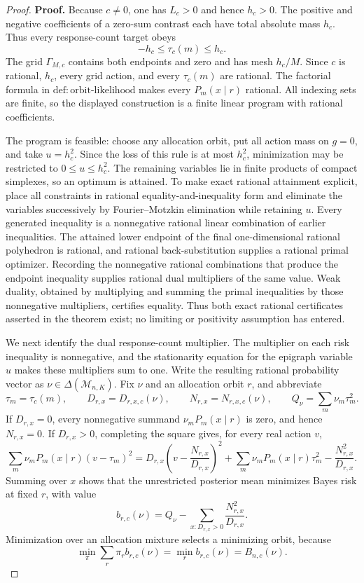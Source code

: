 \documentclass{article}
\begin{document}
\begin{proof}
\textbf{Proof.}
Because \(c\neq0\), one has \(L_c>0\) and hence \(h_c>0\).  The positive and negative coefficients of a zero-sum contrast each have total absolute mass \(h_c\).  Thus every response-count target obeys
\[
 -h_c\leq\tau_c(m)\leq h_c.
\]
The grid \(\Gamma_{M,c}\) contains both endpoints and zero and has mesh \(h_c/M\).  Since \(c\) is rational, \(h_c\), every grid action, and every \(\tau_c(m)\) are rational.  The factorial formula in \(\mathrm{def:orbit\text{-}likelihood}\) makes every \(P_m(x\mid r)\) rational.  All indexing sets are finite, so the displayed construction is a finite linear program with rational coefficients.

The program is feasible: choose any allocation orbit, put all action mass on \(g=0\), and take \(u=h_c^2\).  Since the loss of this rule is at most \(h_c^2\), minimization may be restricted to \(0\leq u\leq h_c^2\).  The remaining variables lie in finite products of compact simplexes, so an optimum is attained.  To make exact rational attainment explicit, place all constraints in rational equality-and-inequality form and eliminate the variables successively by Fourier--Motzkin elimination while retaining \(u\).  Every generated inequality is a nonnegative rational linear combination of earlier inequalities.  The attained lower endpoint of the final one-dimensional rational polyhedron is rational, and rational back-substitution supplies a rational primal optimizer.  Recording the nonnegative rational combinations that produce the endpoint inequality supplies rational dual multipliers of the same value.  Weak duality, obtained by multiplying and summing the primal inequalities by those nonnegative multipliers, certifies equality.  Thus both exact rational certificates asserted in the theorem exist; no limiting or positivity assumption has entered.

We next identify the dual response-count multiplier.  The multiplier on each risk inequality is nonnegative, and the stationarity equation for the epigraph variable \(u\) makes these multipliers sum to one.  Write the resulting rational probability vector as \(\nu\in\Delta(\mathcal M_{n,K})\).  Fix \(\nu\) and an allocation orbit \(r\), and abbreviate
\[
 \tau_m=\tau_c(m),\qquad
 D_{r,x}=D_{r,x,c}(\nu),\qquad
 N_{r,x}=N_{r,x,c}(\nu),\qquad
 Q_\nu=\sum_m\nu_m\tau_m^2.
\]
If \(D_{r,x}=0\), every nonnegative summand \(\nu_mP_m(x\mid r)\) is zero, and hence \(N_{r,x}=0\).  If \(D_{r,x}>0\), completing the square gives, for every real action \(v\),
\[
 \sum_m\nu_mP_m(x\mid r)(v-\tau_m)^2
 =D_{r,x}\left(v-\frac{N_{r,x}}{D_{r,x}}\right)^2
 +\sum_m\nu_mP_m(x\mid r)\tau_m^2
 -\frac{N_{r,x}^2}{D_{r,x}}.
\]
Summing over \(x\) shows that the unrestricted posterior mean minimizes Bayes risk at fixed \(r\), with value
\[
 b_{r,c}(\nu)=Q_\nu-
 \sum_{x:D_{r,x}>0}\frac{N_{r,x}^2}{D_{r,x}}.
\]
Minimization over an allocation mixture selects a minimizing orbit, because
\[
 \min_{\pi}\sum_r\pi_rb_{r,c}(\nu)=\min_rb_{r,c}(\nu)=B_{n,c}(\nu).
\]


\end{proof}
\end{document}
